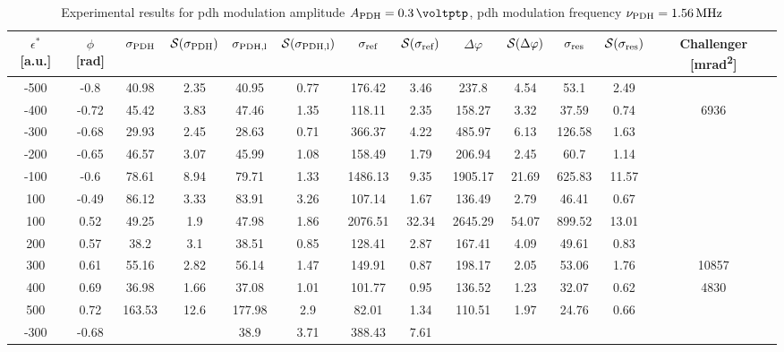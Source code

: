 \begin{landscape}
	
	\begin{table}
	\centering
	\begin{tabular}{|c|c|c|c|c|c|c|c|c|c|c|c|c|}
		\hline
		$\epsilon^*$ [a.u.] & $\phi$ [\si{\radian}] & $\sigma_{\text{PDH}}$ & $\mathcal{S}(\sigma_{\text{PDH}})$ & $\sigma_{\text{PDH,l}}$ & $\mathcal{S}(\sigma_{\text{PDH,l}})$  & $\sigma_{\text{ref}}$ & $\mathcal{S}(\sigma_{\text{ref}})$ & $\Delta \varphi$ & $\mathcal{S}(\Delta \varphi)$ & $\sigma_{\text{res}}$  & $\mathcal{S}(\sigma_{\text{res}})$ & Challenger [\si{\milli\radian\squared}] \\
		\hline
		\hline
		-500 & -0.8 & 40.98 & 2.35 & 40.95 & 0.77 & 176.42 & 3.46 & 237.8 & 4.54 & 53.1 & 2.49 & \\
		-400 & -0.72 & 45.42 & 3.83 & 47.46 & 1.35 & 118.11 & 2.35 & 158.27 & 3.32 & 37.59 & 0.74 & 6936\\
		-300 & -0.68 & 29.93 & 2.45 & 28.63 & 0.71 & 366.37 & 4.22 & 485.97 & 6.13 & 126.58 & 1.63 & \\
		-200 & -0.65 & 46.57 & 3.07 & 45.99 & 1.08 & 158.49 & 1.79 & 206.94 & 2.45 & 60.7 & 1.14 & \\
		-100 & -0.6 & 78.61 & 8.94 & 79.71 & 1.33 & 1486.13 & 9.35 & 1905.17 & 21.69 & 625.83 & 11.57 & \\
		100 & -0.49 & 86.12 & 3.33 & 83.91 & 3.26 & 107.14 & 1.67 & 136.49 & 2.79 & 46.41 & 0.67 & \\
		100 & 0.52 & 49.25 & 1.9 & 47.98 & 1.86 & 2076.51 & 32.34 & 2645.29 & 54.07 & 899.52 & 13.01 & \\
		200 & 0.57 & 38.2 & 3.1 & 38.51 & 0.85 & 128.41 & 2.87 & 167.41 & 4.09 & 49.61 & 0.83 & \\
		300 & 0.61 & 55.16 & 2.82 & 56.14 & 1.47 & 149.91 & 0.87 & 198.17 & 2.05 & 53.06 & 1.76 & 10857\\
		400 & 0.69 & 36.98 & 1.66 & 37.08 & 1.01 & 101.77 & 0.95 & 136.52 & 1.23 & 32.07 & 0.62 & 4830\\
		500 & 0.72 & 163.53 & 12.6 & 177.98 & 2.9 & 82.01 & 1.34 & 110.51 & 1.97 & 24.76 & 0.66 & \\
		\hline
		\hline
		-300 & -0.68 & & & 38.9 & 3.71 & 388.43 & 7.61 & & & & & \\
		\hline
	\end{tabular}
	\caption{Experimental results for \gls{pdh} modulation amplitude $\tind{A}{PDH} = \SI{0.3}{\voltptp}$, \gls{pdh} modulation frequency $\nu_{\text{PDH}} = \SI{1.56}{\mega\hertz}$}
	\end{table}
	

\end{landscape}
